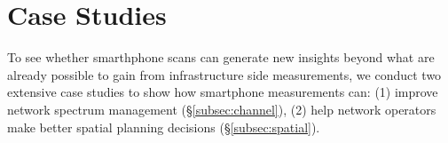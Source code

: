 \section{Case Studies}
\label{sec:case}

To see whether smarthphone scans can generate new insights beyond what are
already possible to gain from infrastructure side measurements, we conduct two
extensive case studies to show how smartphone measurements can: (1) improve
network spectrum management (\S\ref{subsec:channel}), (2) help network operators
make better spatial planning decisions (\S\ref{subsec:spatial}).



